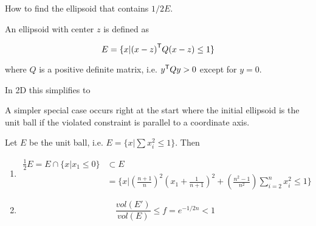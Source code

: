 How to find the ellipsoid that contains $1/2E$. 

\begin{Def}[Ellipsoid] An ellipsoid with center $z$ is defined as

\[E=\{x|{(x-z)}^\text{\upshape \sffamily T}Q(x-z)\leq 1\}\]

where $Q$ is a positive definite matrix, i.e. ${y}^\text{\upshape \sffamily T} Q y>0$ except for $y=0$.

In 2D this simplifies to

\end{Def}

A simpler special case occurs right at the start where the initial ellipsoid is the unit ball if the violated constraint is parallel to a coordinate axis.


\begin{lem} Let $E$ be the unit ball, i.e. $E=\{x|\sum x_i^2\leq 1\}$. Then

\begin{enumerate}
\item 
\begin{align*}
\frac{1}{2}E=E\cap \{x|x_1\leq 0\} &\subset E\\
	&= \{x|\left(\frac{n+1}{n}\right)^2\left(x_1+\frac{1}{n+1}\right)^2+\left(\frac{n^2-1}{n^2}\right) \sum_{i=2}^n x_i^2 \leq 1\}
\end{align*}
\item \[\frac{vol(E')}{vol(E)}\leq f = e^{-1/2n}<1\]
\end{enumerate}
\end{lem}

